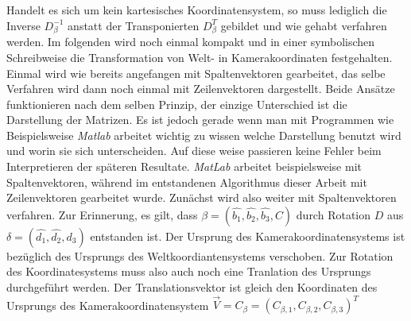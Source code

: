 Handelt es sich um kein kartesisches Koordinatensystem, so muss lediglich die Inverse \ensuremath{D_\beta^{-1}} anstatt der Transponierten \ensuremath{D_\beta^T} gebildet und wie gehabt verfahren werden. Im folgenden wird noch einmal kompakt und in einer symbolischen Schreibweise die Transformation von Welt- in Kamerakoordinaten  festgehalten. Einmal wird wie bereits angefangen mit Spaltenvektoren gearbeitet, das selbe Verfahren wird dann noch einmal mit Zeilenvektoren dargestellt.  Beide Ansätze funktionieren nach dem selben Prinzip, der einzige Unterschied ist die Darstellung der Matrizen. Es ist jedoch gerade wenn man mit Programmen wie Beispielsweise \textit{Matlab} arbeitet wichtig zu wissen welche Darstellung benutzt wird und worin sie sich unterscheiden. Auf diese weise passieren keine Fehler beim Interpretieren der späteren Resultate. \textit{MatLab} arbeitet beispielsweise mit Spaltenvektoren, während im entstandenen Algorithmus dieser Arbeit mit Zeilenvektoren gearbeitet wurde. Zunächst wird also weiter mit Spaltenvektoren verfahren. Zur Erinnerung, es gilt, dass $\beta = (\hat{b_1},\hat{b_2},\hat{b_3},C)$ durch Rotation $D$ aus $\delta = (\hat{d_1},\hat{d_2},\hat{d_3})$ entstanden ist. Der Ursprung des Kamerakoordinatensystems ist bezüglich des Ursprungs des Weltkoordiantensystems verschoben. Zur Rotation des Koordinatesystems muss also auch noch eine Tranlation des Ursprungs durchgeführt werden. Der Translationsvektor ist gleich den Koordinaten des Ursprungs des Kamerakoordinatensystem $\vec{V} = C_\beta = (C_{\beta,1}, C_{\beta,2}, C_{\beta,3})^T$ 

	

